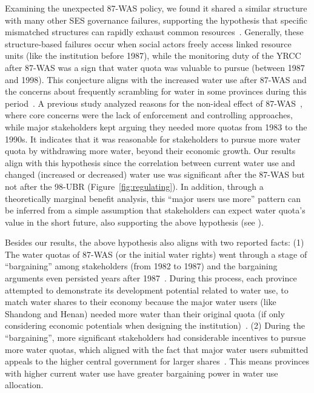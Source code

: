 \documentclass[preprint, 12pt]{elsarticle}
\begin{document}
Examining the unexpected 87-WAS policy, we found it shared a similar structure with many other SES governance failures, supporting the hypothesis that specific mismatched structures can rapidly exhaust common resources~\cite{kellenberg2009,cai2016,barnes2019}.
Generally, these structure-based failures occur when social actors freely access linked resource units (like the institution before 1987), while the monitoring duty of the YRCC after 87-WAS was a sign that water quota was valuable to pursue (between 1987 and 1998).
This conjecture aligns with the increased water use after 87-WAS and the concerns about frequently scrambling for water in some provinces during this period~\cite{mao2000, bouckaert2022}.
A previous study analyzed reasons for the non-ideal effect of 87-WAS~\cite{huangang2002}, where core concerns were the lack of enforcement and controlling approaches, while major stakeholders kept arguing they needed more quotas from 1983 to the 1990s.
It indicates that it was reasonable for stakeholders to pursue more water quota by withdrawing more water, beyond their economic growth.
Our results align with this hypothesis since the correlation between current water use and changed (increased or decreased) water use was significant after the 87-WAS but not after the 98-UBR (Figure~\ref{fig:regulating}).
In addition, through a theoretically marginal benefit analysis, this ``major users use more'' pattern can be inferred from a simple assumption that stakeholders can expect water quota's value in the short future, also supporting the above hypothesis (see \textit{}).

Besides our results, the above hypothesis also aligns with two reported facts:
(1) The water quotas of 87-WAS (or the initial water rights) went through a stage of ``bargaining'' among stakeholders (from 1982 to 1987) and the bargaining arguments even persisted years after 1987~\cite{wang2019e, wang2019d}.
During this process, each province attempted to demonstrate its development potential related to water use, to match water shares to their economy because the major water users (like Shandong and Henan) needed more water than their original quota (if only considering economic potentials when designing the institution)~\cite{zuo2020}.
(2) During the ``bargaining'', more significant stakeholders had considerable
incentives to pursue more water quotas, which aligned with the fact that major water users submitted appeals to the higher central government for larger shares~\cite{wang2019e, wang2019d}.
This means provinces with higher current water use have greater bargaining power in water use allocation.
\end{document}
